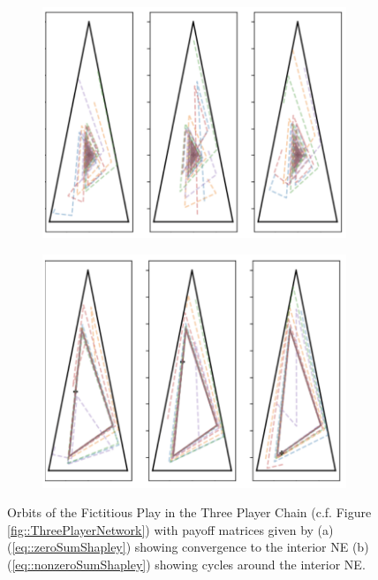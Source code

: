 \documentclass{article}
\theoremstyle{definition}
\begin{document}
  \begin{figure}[t]
    \centering
    \begin{subfigure}[b]{0.45 \textwidth}
      \includegraphics[width = \textwidth]{Figures/convergentShapley.png}
    \caption{\label{fig::convergentShapley}}
    \end{subfigure}
    \begin{subfigure}[b]{0.45 \textwidth}
      \includegraphics[width = \textwidth]{Figures/nonConvergentShapley.png}
      \caption{\label{fig::nonconvergentShapley}}
    \end{subfigure}
    \caption{\label{fig::Shapley} Orbits of the Fictitious Play in the Three Player Chain (c.f.
    Figure \ref{fig::ThreePlayerNetwork}) with payoff matrices given by (a)
    (\ref{eq::zeroSumShapley}) showing convergence to the interior NE (b)
    (\ref{eq::nonzeroSumShapley}) showing cycles around the interior NE.}
  \end{figure}
\end{document}
